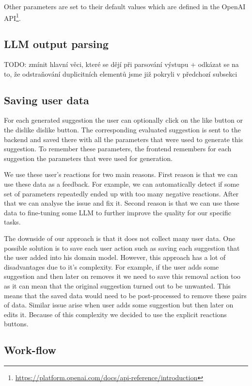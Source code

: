 Other parameters are set to their default values which are defined in the OpenAI API\footnote{\url{https://platform.openai.com/docs/api-reference/introduction}}.


\subsection{LLM output parsing}

TODO: zmínit hlavní věci, které se dějí při parsování výstupu + odkázat se na to, že odstraňování duplicitních elementů jsme již pokryli v předchozí subsekci \\


\subsection{Saving user data}

For each generated suggestion the user can optionally click on the like button or the dislike dislike button. The corresponding evaluated suggestion is sent to the backend and saved there with all the parameters that were used to generate this suggestion. To remember these parameters, the frontend remembers for each suggestion the parameters that were used for generation.

We use these user's reactions for two main reasons. First reason is that we can use these data as a feedback. For example, we can automatically detect if some set of parameters repeatedly ended up with too many negative reactions. After that we can analyse the issue and fix it. Second reason is that we can use these data to fine-tuning some LLM to further improve the quality for our specific tasks.

The downside of our approach is that it does not collect many user data. One possible solution is to save each user action such as saving each suggestion that the user added into his domain model. However, this approach has a lot of disadvantages due to it's complexity. For example, if the user adds some suggestion and then later on removes it we need to save this removal action too as it can mean that the original suggestion turned out to be unwanted. This means that the saved data would need to be post-processed to remove these pairs of data. Similar issue arise when user adds some suggestion but then later on edits it. Because of this complexity we decided to use the explicit reactions buttons.


\subsection{Work-flow}

